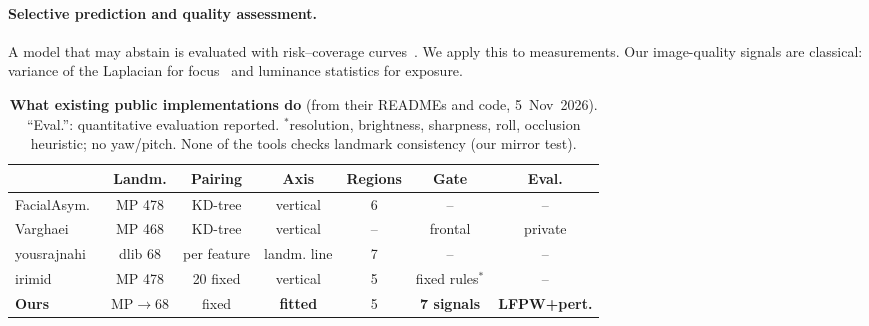 \paragraph{Selective prediction and quality assessment.}
A model that may abstain is evaluated with risk--coverage curves~\cite{geifman2017selective}.
We apply this to measurements. Our image-quality signals are classical: variance of the
Laplacian for focus~\cite{pertuz2013focus} and luminance statistics for exposure.

\begin{table}[t]
\centering\footnotesize
\setlength{\tabcolsep}{2.5pt}
\begin{tabular}{@{}lcccccc@{}}
\toprule
 & Landm. & Pairing & Axis & Regions & Gate & Eval.\\
\midrule
FacialAsym.~\cite{nashokan_facialasymmetry} & MP 478 & KD-tree & vertical & 6 & -- & --\\
Varghaei~\cite{varghaei2025aesthetic} & MP 468 & KD-tree & vertical & -- & frontal & private\\
yousrajnahi~\cite{yousrajnahi_symmetry} & dlib 68 & per feature & landm. line & 7 & -- & --\\
irimid~\cite{irimid} & MP 478 & 20 fixed & vertical & 5 & fixed rules$^{*}$ & --\\
\textbf{Ours} & MP$\to$68 & fixed & \textbf{fitted} & 5 & \textbf{7 signals} & \textbf{LFPW+pert.}\\
\bottomrule
\end{tabular}
\caption{\textbf{What existing public implementations do} (from their READMEs and code,
5~Nov~2026). ``Eval.'': quantitative evaluation reported. $^{*}$resolution, brightness,
sharpness, roll, occlusion heuristic; no yaw/pitch. None of the tools checks landmark
consistency (our mirror test).}
\label{tab:related}
\end{table}

